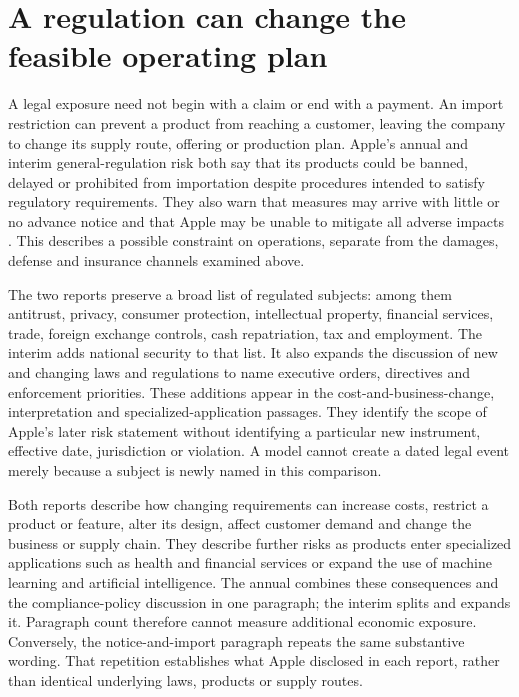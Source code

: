 \section{A regulation can change the feasible operating plan}
\label{sec:apple-regulation}

A legal exposure need not begin with a claim or end with a payment. An import
restriction can prevent a product from reaching a customer, leaving the company
to change its supply route, offering or production plan. Apple's annual and
interim general-regulation risk both say that its products could be banned,
delayed or prohibited from importation despite procedures intended to satisfy
regulatory requirements. They also warn that measures may arrive with little
or no advance notice and that Apple may be unable to mitigate all adverse
impacts \citep[Risk Factors, printed pp.~13--14]{apple2024}
\citep[Part II, Item 1A, printed p.~19]{apple2025q1}. This describes a possible
constraint on operations, separate from the damages, defense and insurance
channels examined above.

The two reports preserve a broad list of regulated subjects: among them
antitrust, privacy, consumer protection, intellectual property, financial
services, trade, foreign exchange controls, cash repatriation, tax and
employment. The interim adds national security to that list. It also expands
the discussion of new and changing laws and regulations to name executive
orders, directives and enforcement priorities. These additions appear in the
cost-and-business-change, interpretation and specialized-application passages.
They identify the scope of Apple's later risk statement without identifying
a particular new instrument, effective date, jurisdiction or violation. A
model cannot create a dated legal event merely because a subject is newly
named in this comparison.

Both reports describe how changing requirements can increase costs, restrict
a product or feature, alter its design, affect customer demand and change the
business or supply chain. They describe further risks as products enter
specialized applications such as health and financial services or expand the
use of machine learning and artificial intelligence. The annual combines these
consequences and the compliance-policy discussion in one paragraph; the interim
splits and expands it. Paragraph count therefore cannot measure additional
economic exposure. Conversely, the notice-and-import paragraph repeats the
same substantive wording. That repetition establishes what Apple disclosed in
each report, rather than identical underlying laws, products or supply routes.

